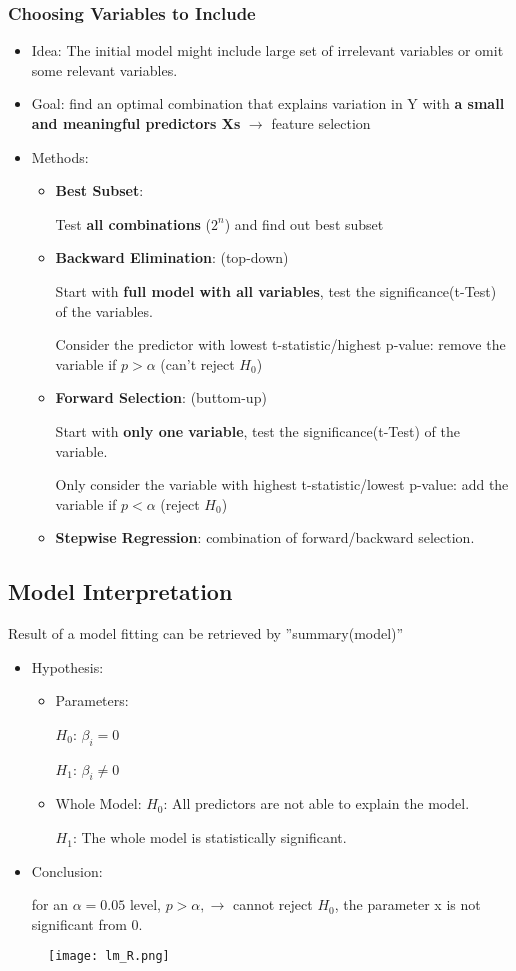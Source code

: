 \subsubsection{Choosing Variables to Include}
\begin{itemize}
	\item Idea: The initial model might include large set of irrelevant variables or omit some relevant variables. 
	\item Goal: find an optimal combination that explains variation in Y with \textbf{a small and meaningful predictors Xs} $\rightarrow$ feature selection
	\item Methods:
	\begin{itemize}
		\item \textbf{Best Subset}: 
		
		Test \textbf{all combinations} ($2^n$) and find out best subset 
		\item \textbf{Backward Elimination}: (top-down)
		
		Start with\textbf{ full model with all variables}, test the significance(t-Test) of the variables.
		
		Consider the predictor with lowest t-statistic/highest p-value: remove the variable if $p > \alpha$ (can't reject $H_0$)  
		\item \textbf{Forward Selection}: (buttom-up)
		
		Start with \textbf{only one variable}, test the significance(t-Test) of the variable.
		
		Only consider the variable with highest t-statistic/lowest p-value: add the variable if $p < \alpha$ (reject $H_0$)
		\item \textbf{Stepwise Regression}: combination of forward/backward selection.
	\end{itemize}
\end{itemize}
 
\subsection{Model Interpretation}
Result of a model fitting can be retrieved by ''summary(model)''
\begin{itemize}
	\item Hypothesis:
	\begin{itemize}
		\item Parameters: 
		
		$H_0$: $\beta_i = 0$
		
		$H_1$: $\beta_i \neq 0$
		\item Whole Model: 
		$H_0$: All predictors are not able to explain the model.
		
		$H_1$: The whole model is statistically significant. 		 
	\end{itemize}
	\item Conclusion: 
	
	for an $\alpha = 0.05$ level, $p > \alpha, \rightarrow$ cannot reject $H_0$, the parameter x is not significant from 0. 
\end{itemize}
\begin{figure}[H]
	\centering
	\texttt{[image: lm\_R.png]}
\end{figure}	

